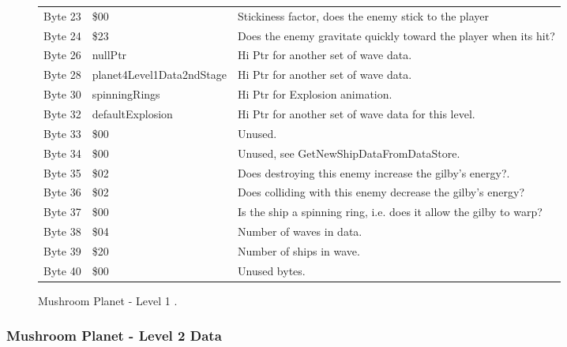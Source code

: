 \begin{figure}[H]
{\begin{adjustbox}{width=12cm}
\begin{tabular}{lll}
 Byte 23 & \$00                       & Stickiness factor, does the enemy stick to the player              \\
 Byte 24 & \$23                       & Does the enemy gravitate quickly toward the player when its hit?   \\
 Byte 26 & nullPtr                   & Hi Ptr for another set of wave data.                               \\
 Byte 28 & planet4Level1Data2ndStage & Hi Ptr for another set of wave data.                               \\
 Byte 30 & spinningRings             & Hi Ptr for Explosion animation.                                    \\
 Byte 32 & defaultExplosion          & Hi Ptr for another set of wave data for this level.                \\
 Byte 33 & \$00                       & Unused.                                                            \\
 Byte 34 & \$00                       & Unused, see GetNewShipDataFromDataStore.                           \\
 Byte 35 & \$02                       & Does destroying this enemy increase the gilby's energy?.           \\
 Byte 36 & \$02                       & Does colliding with this enemy decrease the gilby's energy?        \\
 Byte 37 & \$00                       & Is the ship a spinning ring, i.e. does it allow the gilby to warp? \\
 Byte 38 & \$04                       & Number of waves in data.                                           \\
 Byte 39 & \$20                       & Number of ships in wave.                                           \\
 Byte 40 & \$00                       & Unused bytes.                                                      \\
\bottomrule
\end{tabular}

  \end{adjustbox}

  }\caption*{Mushroom Planet - Level 1
.}
\end{figure}

\clearpage
\subsubsection{Mushroom Planet - Level 2 Data}

